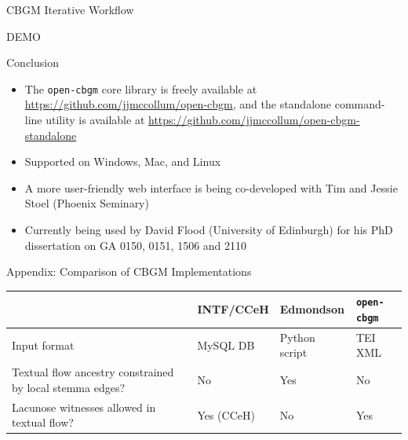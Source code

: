 \documentclass[10pt]{beamer}
\begin{document}
	\begin{frame}{CBGM Iterative Workflow}
		\begin{center}
			DEMO
		\end{center}
	\end{frame}
	\begin{frame}{Conclusion}
		\begin{itemize}
			\item The \texttt{open-cbgm} core library is freely available at \url{https://github.com/jjmccollum/open-cbgm}, and the standalone command-line utility is available at \url{https://github.com/jjmccollum/open-cbgm-standalone}
			\item Supported on Windows, Mac, and Linux
			\item A more user-friendly web interface is being co-developed with Tim and Jessie Stoel (Phoenix Seminary)
			\item Currently being used by David Flood (University of Edinburgh) for his PhD dissertation on GA 0150, 0151, 1506 and 2110
		\end{itemize}
	\end{frame}
	\begin{frame}[allowframebreaks]
		\printbibliography
	\end{frame}
	\begin{frame}{Appendix: Comparison of CBGM Implementations}
		\begin{table}
			\centering
			\begin{tabular}{p{6em}p{6em}p{6em}p{4em}}
				 & \phantom{text}\newline INTF/CCeH & \phantom{text}\newline Edmondson & \texttt{open-}\newline\texttt{cbgm}\\
				\hline
				\hline
				Input format & MySQL DB & Python script & TEI XML\\
				\hline
				Textual flow ancestry constrained by local stemma edges? & No & Yes & No\\
				\hline
				Lacunose witnesses allowed in textual flow? & Yes (CCeH) & No & Yes
			\end{tabular}
		\end{table}
	\end{frame}
\end{document}
